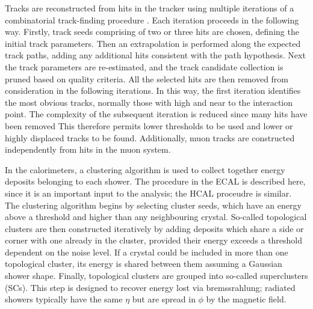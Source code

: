 Tracks are reconstructed from hits in the tracker using multiple iterations of a combinatorial track-finding procedure \cite{TrackReco}.
Each iteration proceeds in the following way.
Firstly, track seeds comprising of two or three hits are chosen, defining the initial track parameters.
Then an extrapolation is performed along the expected track paths, adding any additional hits consistent with the path hypothesis.
Next the track parameters are re-estimated, and the track candidate collection is pruned based on quality criteria.
All the selected hits are then removed from consideration in the following iterations.
In this way, the first iteration identifies the most obvious tracks, normally those with high \pt and near to the interaction point.
The complexity of the subsequent iteration is reduced since many hits have been removed
This therefore permits lower thresholds to be used and lower \pt or highly displaced tracks to be found.
Additionally, muon tracks are constructed independently from hits in the muon system.

In the calorimeters, a clustering algorithm is used to collect together energy deposits belonging to each shower. %
The procedure in the ECAL is described here, since it is an important input to the \Hgg analysis; the HCAL proceudre is similar.
The clustering algorithm begins by selecting cluster seeds, which have an energy above a threshold and higher than any neighbouring crystal.
So-called topological clusters are then constructed iteratively by adding deposits which share a side or corner with one already in the cluster, 
provided their energy exceeds a threshold dependent on the noise level. %
If a crystal could be included in more than one topological cluster, its energy is shared between them assuming a Gaussian shower shape.
Finally, topological clusters are grouped into so-called superclusters (SCs).
This step is designed to recover energy lost via bremssrahlung; 
radiated showers typically have the same $\eta$ but are spread in $\phi$ by the magnetic field.


